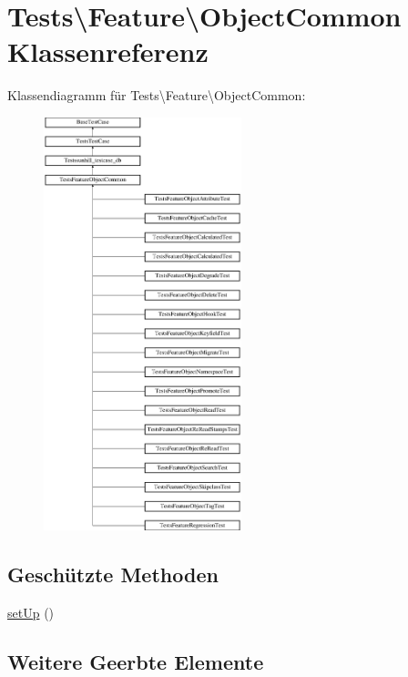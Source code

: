 \hypertarget{classTests_1_1Feature_1_1ObjectCommon}{}\section{Tests\textbackslash{}Feature\textbackslash{}Object\+Common Klassenreferenz}
\label{classTests_1_1Feature_1_1ObjectCommon}
Klassendiagramm für Tests\textbackslash{}Feature\textbackslash{}Object\+Common\+:\begin{figure}[H]
\begin{center}
\leavevmode
\includegraphics[height=12.000000cm]{d5/dbe/classTests_1_1Feature_1_1ObjectCommon}
\end{center}
\end{figure}
\subsection*{Geschützte Methoden}
\begin{DoxyCompactItemize}
\item 
\hyperlink{classTests_1_1Feature_1_1ObjectCommon_ae6c07b20d8690a20c0e4da7116798561}{set\+Up} ()
\end{DoxyCompactItemize}
\subsection*{Weitere Geerbte Elemente}


